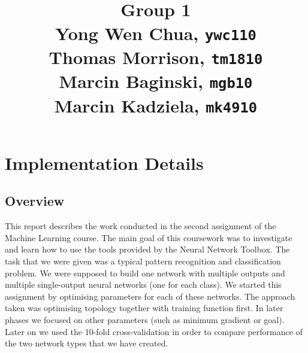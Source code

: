 \documentclass[a4paper]{article}
\title{
\vspace{2in}
\textmd{\textbf{\hmwkTitle}}\\
\vspace{3in}
\textbf{Group 1}\\
Yong Wen Chua, \texttt{ywc110}\\
Thomas Morrison, \texttt{tm1810}\\
Marcin Baginski, \texttt{mgb10}\\
Marcin Kadziela, \texttt{mk4910}
}
\date{} %
\begin{document}
\maketitle



\newpage
\tableofcontents
\newpage


\section{Implementation Details}
\subsection{Overview}
This report describes the work conducted in the second assignment of the Machine Learning course. The main goal of this coursework was to investigate and learn how to use the tools provided by the  Neural Network Toolbox. The task that we were given was a typical pattern recognition and classification problem. We were supposed to build one network with multiple outputs and multiple single-output neural networks (one for each class). We started this assignment by optimising parameters for each of these networks. The approach taken was optimising topology together with training function first. In later phases we focused on other parameters (such as minimum gradient or goal). Later on we used the 10-fold cross-validation in order to compare performance of the two network types that we have created.
\end{document}
